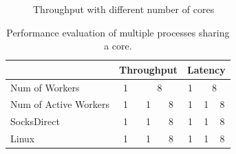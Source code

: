 \begin{figure}[htpb]

	\caption{Throughput with different number of cores}
	\label{fig:eval-corenum-tput}
\end{figure}


\begin{table}[t]
	\centering
		\begin{tabular}{l|c|c|c|c|c|c|}
			\hline
				& \multicolumn{3}{c|}{Throughput} & \multicolumn{3}{c|}{Latency} \\
			\hline
			Num of Workers	& \multicolumn{1}{c|}{1} & \multicolumn{2}{c|}{8} & \multicolumn{1}{c|}{1} & \multicolumn{2}{c|}{8} \\
			\hline
			Num of Active Workers	& 1 & 1 & 8 & 1 & 1 & 8 \\
			\hline
			\hline
			SocksDirect 	& 1 & 1 & 8 & 1 & 1 & 8 \\
			\hline
			Linux 	& 1 & 1 & 8 & 1 & 1 & 8 \\
			\hline
		\end{tabular}
	\caption{Performance evaluation of multiple processes sharing a core.}
	\label{tab:eval-context-switch}
\end{table}



